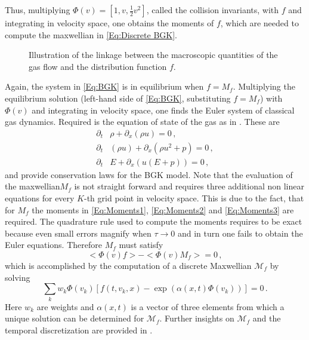 Thus, multiplying \(\Phi(v) = [1,v,\frac{1}{2} v^2]\), called the collision invariants, with \(f\) and integrating in velocity space, one obtains the moments of \(f\), which are needed to compute the maxwellian in \cref{Eq:Discrete BGK}.
\begin{wrapfigure}{r}{0.5\textwidth}
	\vspace{-10pt}
	
	\caption{Illustration of the linkage between the macroscopic quantities of the gas flow and the distribution function \(f\).}
	\vspace{-30pt}
	\label{Fig:Demo Macro}
\end{wrapfigure}
Again, the system in \cref{Eq:BGK} is in equilibrium when \(f = M_f\). Multiplying the equilibrium solution (left-hand side of \cref{Eq:BGK}, substituting \(f=M_f\)) with \(\Phi(v)\) and integrating in velocity space, one finds the Euler system of classical gas dynamics. Required is the equation of state of the gas as in \cite{puppo2019kinetic}. These are
\begin{align}
	\partial_t&\rho + \partial_x(\rho u) = 0 \,, \label{Eq:Conservation1} \\
	\partial_t&(\rho u) + \partial_x(\rho u^2 + p) = 0 \,, \label{Eq:Conservation2}\\
	\partial_t&E + \partial_x(u(E+p)) = 0\,, \label{Eq:Conservation3}
\end{align}
and provide conservation laws for the BGK model. Note that the evaluation of the maxwellian\(M_f\) is not straight forward and requires three additional non linear equations for every \(K\)-th grid point in velocity space. This is due to the fact, that for \(M_f\) the moments in \cref{Eq:Moments1}, \cref{Eq:Moments2} and \cref{Eq:Moments3} are required. The quadrature rule used to compute the moments requires to be exact because even small errors magnify when \(\tau \rightarrow 0\) and in turn one fails to obtain the Euler equations. Therefore \(M_f\) must satisfy  
\begin{equation}
	<\Phi(v)f> - <\Phi(v)M_f> = 0\,,
\end{equation}
which is accomplished by the computation of a discrete Maxwellian \(\mathcal{M}_f\) by solving
\begin{equation}
	\sum_k w_k \Phi(v_k) [f(t,v_k,x) - \exp(\alpha(x,t)\Phi(v_k))] = 0\,.
\end{equation}
Here \(w_k\) are weights and \(\alpha(x,t)\) is a vector of three elements from which a unique solution can be determined for \(\mathcal{M}_f\). Further insights on \(\mathcal{M}_f\) and the temporal discretization are provided in \cite{puppo2019kinetic}.\\

